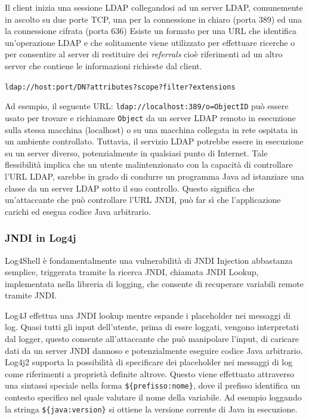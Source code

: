 \documentclass[a4paper, 12pt]{article}
\begin{document}
Il client inizia una sessione LDAP collegandosi ad un server LDAP, comunemente in ascolto su due porte TCP, una per la connessione in chiaro (porta 389) ed una la connessione cifrata (porta 636)
Esiste un formato per una URL che identifica un'operazione LDAP e che solitamente viene utilizzato per effettuare ricerche o per consentire al server di restituire dei \emph{referrals} cioè riferimenti ad un altro server che contiene le informazioni richieste dal client.
\begin{center}
    \verb!ldap://host:port/DN?attributes?scope?filter?extensions!
\end{center}

Ad esempio, il seguente URL: \verb!ldap://localhost:389/o=ObjectID! può essere usato per trovare e richiamare \verb!Object! da un server LDAP remoto in esecuzione sulla stessa macchina (localhost) o su una macchina collegata in rete ospitata in un ambiente controllato.
Tuttavia, il servizio LDAP potrebbe essere in esecuzione su un server diverso, potenzialmente in qualsiasi punto di Internet. Tale flessibilità implica che un utente malintenzionato con la capacità di controllare l'URL LDAP, sarebbe in grado di condurre un programma Java ad istanziare una classe da un server LDAP sotto il suo controllo. 
Questo significa che un'attaccante che può controllare l'URL JNDI, può far sì che l'applicazione carichi ed esegua codice Java arbitrario.


\subsubsection{JNDI in Log4j}

Log4Shell è fondamentalmente una vulnerabilità di JNDI Injection abbastanza semplice, triggerata tramite la ricerca JNDI, chiamata JNDI Lookup, implementata nella libreria di logging, che consente di recuperare variabili remote tramite JNDI.

Log4J effettua una JNDI lookup mentre espande i placeholder nei messaggi di log. Quasi tutti gli input dell'utente, prima di essre loggati, vengono interpretati dal logger, questo consente all'attaccante che può manipolare l'input, di caricare dati da un server JNDI dannoso e potenzialmente eseguire codice Java arbitrario.
Log4j2 supporta la possibilità di specificare dei placeholder nei messaggi di log come riferimenti a proprietà definite altrove. Questo viene effettuato attraverso una sintassi speciale nella forma \verb!${prefisso:nome}!, dove il prefisso identifica un contesto specifico nel quale valutare il nome della variabile.
Ad esempio loggando la stringa \verb!${java:version}! si ottiene la versione corrente di Java in esecuzione.
\end{document}
